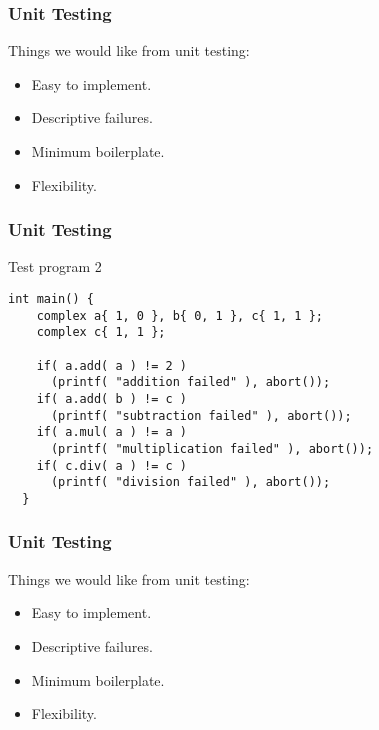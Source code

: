 \begin{frame}[fragile]
  \frametitle{Unit Testing}
  Things we would like from unit testing:
  \begin{itemize}
  \vspace{0.5cm}
  \item Easy to implement.
  \vspace{0.5cm}
  \item Descriptive failures.
  \vspace{0.5cm}
  \item Minimum boilerplate.
  \vspace{0.5cm}
  \item Flexibility.
  \end{itemize}
\end{frame}

\begin{frame}[fragile]
  \frametitle{Unit Testing}
  \begin{block}{Test program 2}
    \begin{lstlisting}[style=C]
  int main() {
    complex a{ 1, 0 }, b{ 0, 1 }, c{ 1, 1 };
    complex c{ 1, 1 };

    if( a.add( a ) != 2 )
      (printf( "addition failed" ), abort());
    if( a.add( b ) != c )
      (printf( "subtraction failed" ), abort());
    if( a.mul( a ) != a )
      (printf( "multiplication failed" ), abort());
    if( c.div( a ) != c )
      (printf( "division failed" ), abort());
  }
    \end{lstlisting}
  \end{block}
\end{frame}

\begin{frame}[fragile]
  \frametitle{Unit Testing}
  Things we would like from unit testing:
  \begin{itemize}
  \vspace{0.5cm}
  \item Easy to implement.
  \vspace{0.5cm}
  \item Descriptive failures.
  \vspace{0.5cm}
  \item Minimum boilerplate.
  \vspace{0.5cm}
  \item Flexibility.
  \end{itemize}
\end{frame}

